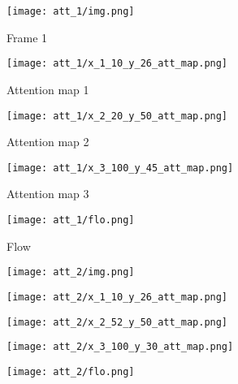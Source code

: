 \documentclass[10pt,twocolumn,letterpaper]{article}
\begin{document}
\begin{figure*}[ht!]
     \centering
     \begin{subfigure}[b]{0.195\textwidth}
         \centering
         \caption*{Frame 1}
         \texttt{[image: att\_1/img.png]}
     \end{subfigure}\hfill
     \begin{subfigure}[b]{0.195\textwidth}
         \centering
         \caption*{Attention map 1}
         \texttt{[image: att\_1/x\_1\_10\_y\_26\_att\_map.png]}
     \end{subfigure}\hfill
     \begin{subfigure}[b]{0.195\textwidth}
         \centering
         \caption*{Attention map 2}
         \texttt{[image: att\_1/x\_2\_20\_y\_50\_att\_map.png]}
     \end{subfigure}\hfill
     \begin{subfigure}[b]{0.195\textwidth}
         \centering
         \caption*{Attention map 3}
         \texttt{[image: att\_1/x\_3\_100\_y\_45\_att\_map.png]}
     \end{subfigure}\hfill
     \begin{subfigure}[b]{0.195\textwidth}
         \centering
         \caption*{Flow}
         \texttt{[image: att\_1/flo.png]}
     \end{subfigure}

     \begin{subfigure}[b]{0.195\textwidth}
         \centering
         \texttt{[image: att\_2/img.png]}
     \end{subfigure}\hfill
     \begin{subfigure}[b]{0.195\textwidth}
         \centering
         \texttt{[image: att\_2/x\_1\_10\_y\_26\_att\_map.png]}
     \end{subfigure}\hfill
     \begin{subfigure}[b]{0.195\textwidth}
         \centering
         \texttt{[image: att\_2/x\_2\_52\_y\_50\_att\_map.png]}
     \end{subfigure}\hfill
     \begin{subfigure}[b]{0.195\textwidth}
         \centering
         \texttt{[image: att\_2/x\_3\_100\_y\_30\_att\_map.png]}
     \end{subfigure}\hfill
     \begin{subfigure}[b]{0.195\textwidth}
         \centering
         \texttt{[image: att\_2/flo.png]}
     \end{subfigure}


\end{figure*}
\end{document}
